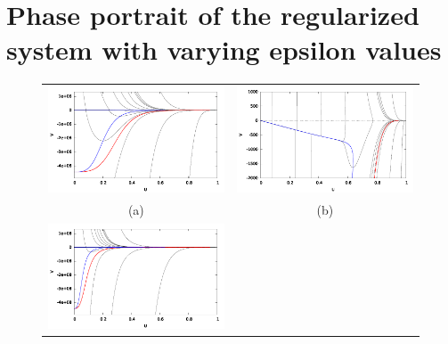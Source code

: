 \documentclass{article}
\begin{document}
\section{Phase portrait of the regularized system with varying epsilon values}

\begin{figure}[bht] \begin{center}
    \begin{tabular}{c c}
    \includegraphics[scale = 0.5]{regPhasePlane_epsilon10e-1.pdf} &
    \includegraphics[scale = 0.5]{regPhasePlaneZoomed_epsilon10e-1.pdf} \\
    (a) & (b)\\
    \includegraphics[scale = 0.5]{regPhasePlane_epsilon10e-3.pdf} &

\end{tabular}
\end{center}
\end{figure}
\end{document}
